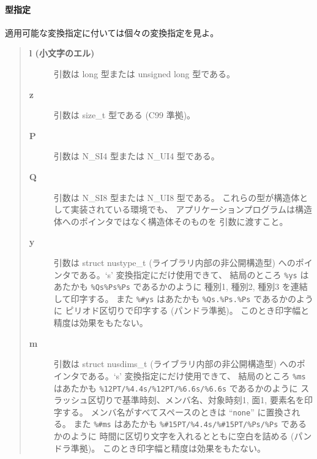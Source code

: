 \paragraph{型指定}
適用可能な変換指定に付いては個々の変換指定を見よ。
\begin{quote}\begin{description}
\item[{\bf l (小文字のエル)}] 引数は long 型または unsigned long 型である。
\item[{\bf z}] 引数は size\_t 型である (C99 準拠)。
\item[{\bf P}] 引数は N\_SI4 型または N\_UI4 型である。
\item[{\bf Q}] 引数は N\_SI8 型または N\_UI8 型である。
これらの型が構造体として実装されている環境でも、
アプリケーションプログラムは構造体へのポインタではなく構造体そのものを
引数に渡すこと。
\item[{\bf y}] 引数は struct nustype\_t (ライブラリ内部の非公開構造型)
へのポインタである。`s' 変換指定にだけ使用できて、
結局のところ {\tt \%ys} はあたかも {\tt \%Qs\%Ps\%Ps} であるかのように
種別1, 種別2, 種別3 を連結して印字する。
また {\tt \%\#ys} はあたかも {\tt \%Qs.\%Ps.\%Ps} であるかのように
ピリオド区切りで印字する (パンドラ準拠)。
このとき印字幅と精度は効果をもたない。
\item[{\bf m}] 引数は struct nusdims\_t (ライブラリ内部の非公開構造型)
へのポインタである。`s' 変換指定にだけ使用できて、
結局のところ {\tt \%ms} はあたかも
{\tt \%12PT/\%4.4s/\%12PT/\%6.6s/\%6.6s} であるかのように
スラッシュ区切りで基準時刻、メンバ名、対象時刻1, 面1, 要素名を印字する。
メンバ名がすべてスペースのときは ``{\tt none}'' に置換される。
また {\tt \%\#ms} はあたかも
{\tt \%\#15PT/\%4.4s/\%\#15PT/\%Ps/\%Ps} であるかのように
時間に区切り文字を入れるとともに空白を詰める (パンドラ準拠)。
このとき印字幅と精度は効果をもたない。
\end{description}\end{quote}

